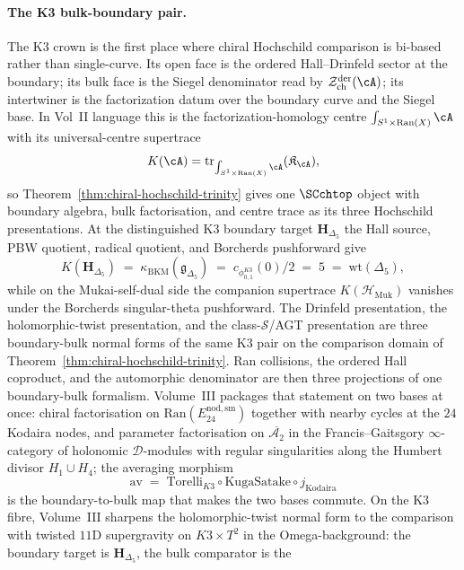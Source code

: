 \paragraph{The K3 bulk-boundary pair.}
The K3 crown is the first place where chiral Hochschild comparison is
bi-based rather than single-curve. Its open face is the ordered
Hall--Drinfeld sector at the boundary; its bulk face is the Siegel
denominator read by $\cZ^{\mathrm{der}}_{\mathrm{ch}}(\cA)$; its
intertwiner is the factorization datum over the boundary curve and the
Siegel base. In Vol~II language this is the factorization-homology centre
$\int_{S^1\times\mathrm{Ran}(X)}\cA$ with its universal-centre
supertrace
\[
K(\cA)=\operatorname{tr}_{\int_{S^1\times\mathrm{Ran}(X)}\cA}
(\mathfrak{K}_{\cA}),
\]
so Theorem~\ref{thm:chiral-hochschild-trinity} gives one $\SCchtop$
object with boundary algebra, bulk factorisation, and centre trace as
its three Hochschild presentations. At the distinguished K3 boundary
target $\mathbf{H}_{\Delta_5}$ the Hall source, PBW quotient, radical
quotient, and Borcherds pushforward give
\[
K(\mathbf{H}_{\Delta_5})
\;=\;
\kappa_{\mathrm{BKM}}(\mathfrak{g}_{\Delta_5})
\;=\;
c_{\phi_{0,1}^{K3}}(0)/2
\;=\;
5
\;=\;
\mathrm{wt}(\Delta_5),
\]
while on the Mukai-self-dual side the companion supertrace
$K(\mathcal{H}_{\mathrm{Muk}})$ vanishes under the Borcherds
singular-theta pushforward. The Drinfeld presentation, the
holomorphic-twist presentation, and the class-$\mathcal{S}$/AGT
presentation \cite{Drinfeld90,costello-gaiotto,AGT09,SchiffmannVasserot13}
are three boundary-bulk normal forms of the same K3 pair on the
comparison domain of
Theorem~\ref{thm:chiral-hochschild-trinity}. Ran
collisions, the ordered Hall coproduct, and the automorphic denominator
are then three projections of one boundary-bulk formalism.
Volume~III
packages that statement on two bases at once: chiral factorisation on
$\mathrm{Ran}(E^{\mathrm{nod,sm}}_{24})$ together with nearby cycles
at the $24$ Kodaira nodes, and parameter factorisation on
$\overline{\mathcal{A}_2}$ in the Francis--Gaitsgory
$\infty$-category of holonomic $\mathcal{D}$-modules with regular
singularities along the Humbert divisor $H_1\cup H_4$; the averaging
morphism
\[
\mathrm{av}
\;=\;
\mathrm{Torelli}_{K3}\circ\mathrm{KugaSatake}\circ j_{\mathrm{Kodaira}}
\]
is the boundary-to-bulk map that makes the two bases commute.
On the K3 fibre, Volume~III
sharpens the holomorphic-twist normal form to the comparison with twisted
$11$D supergravity on $K3\times T^2$ in the Omega-background: the
boundary target is $\mathbf{H}_{\Delta_5}$, the bulk comparator is the
